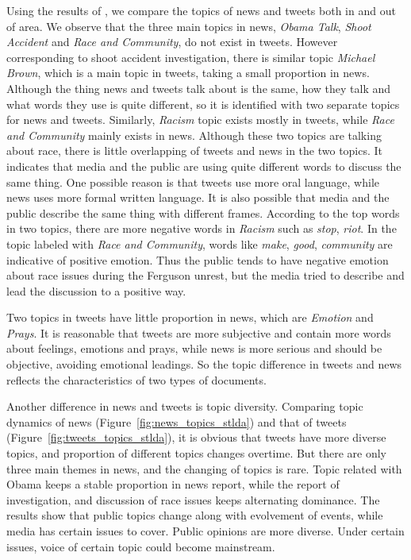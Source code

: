 Using the results of \stlda, we compare the topics of news and tweets both in and out of \stlouis area. We observe that the three main topics in news, \emph{Obama Talk}, \emph{Shoot Accident} and \emph{Race and Community}, do not exist in tweets. However corresponding to shoot accident investigation, there is similar topic \emph{Michael Brown}, which is a main topic in tweets, taking a small proportion in news. Although the thing news and tweets talk about is the same, how they talk and what words they use is quite different, so it is identified with two separate topics for news and tweets. Similarly, \emph{Racism} topic exists mostly in tweets, while \emph{Race and Community} mainly exists in news. Although these two topics are talking about race, there is little overlapping of tweets and news in the two topics. It indicates that media and the public are using quite different words to discuss the same thing. One possible reason is that tweets use more oral language, while news uses more formal written language. It is also possible that media and the public describe the same thing with different frames. According to the top words in two topics, there are more negative words in \emph{Racism} such as \emph{stop}, \emph{riot}. In the topic labeled with \emph{Race and Community}, words like \emph{make}, \emph{good}, \emph{community} are indicative of positive emotion. Thus the public tends to have negative emotion about race issues during the Ferguson unrest, but the media tried to describe and lead the discussion to a positive way.

Two topics in tweets have little proportion in news, which are \emph{Emotion} and \emph{Prays}. It is reasonable that tweets are more subjective and contain more words about feelings, emotions and prays, while news is more serious and should be objective, avoiding emotional leadings. So the topic difference in tweets and news reflects the characteristics of two types of documents.

Another difference in news and tweets is topic diversity. Comparing topic dynamics of news (Figure~\ref{fig:news_topics_stlda}) and that of tweets (Figure~\ref{fig:tweets_topics_stlda}), it is obvious that tweets have more diverse topics, and proportion of different topics changes overtime. But there are only three main themes in news, and the changing of topics is rare. Topic related with Obama keeps a stable proportion in news report, while the report of investigation, and discussion of race issues keeps alternating dominance. The results show that public topics change along with evolvement of events, while media has certain issues to cover. Public opinions are more diverse. Under certain issues, voice of certain topic could become mainstream.

